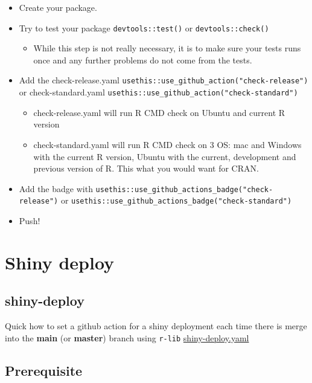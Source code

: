 \documentclass[
]{book}
\providecommand{\tightlist}{%
  \setlength{\itemsep}{0pt}\setlength{\parskip}{0pt}}
\begin{document}
\begin{itemize}
\item
  Create your package.
\item
  Try to test your package \texttt{devtools::test()} or \texttt{devtools::check()}

  \begin{itemize}
  \tightlist
  \item
    While this step is not really necessary, it is to make sure your tests runs once and any further problems do not come from the tests.
  \end{itemize}
\item
  Add the check-release.yaml \texttt{usethis::use\_github\_action("check-release")} or check-standard.yaml \texttt{usethis::use\_github\_action("check-standard")}

  \begin{itemize}
  \tightlist
  \item
    check-release.yaml will run R CMD check on Ubuntu and current R version
  \item
    check-standard.yaml will run R CMD check on 3 OS: mac and Windows with the current R version, Ubuntu with the current, development and previous version of R. This what you would want for CRAN.
  \end{itemize}
\item
  Add the badge with \texttt{usethis::use\_github\_actions\_badge("check-release")} or \texttt{usethis::use\_github\_actions\_badge("check-standard")}
\item
  Push!
\end{itemize}

\hypertarget{shiny-deploy}{%
\chapter{Shiny deploy}\label{shiny-deploy}}

\hypertarget{shiny-deploy-1}{%
\section{shiny-deploy}\label{shiny-deploy-1}}

Quick how to set a github action for a shiny deployment each time there is merge into the \textbf{main} (or \textbf{master}) branch using \texttt{r-lib} \href{https://github.com/r-lib/actions/blob/v2-branch/examples/shiny-deploy.yaml}{shiny-deploy.yaml}

\hypertarget{prerequisite-1}{%
\section{Prerequisite}\label{prerequisite-1}}
\end{document}
